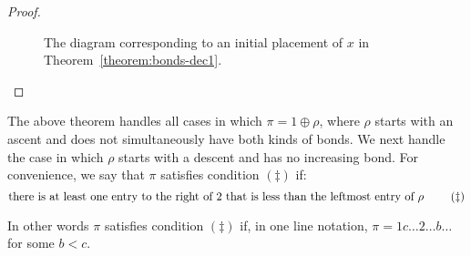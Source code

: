 \documentclass[10pt]{article}
\theoremstyle{plain}
\begin{document}
\begin{proof}
\begin{figure}
\begin{center}
		\end{center}
		\caption{The diagram corresponding to an initial placement of $x$ in Theorem~\ref{theorem:bonds-dec1}.}
		\label{figure:1plus-4}
	\endminipage
\end{figure}
\end{proof}


The above theorem handles all cases in which $\pi = 1 \oplus \rho$, where $\rho$ starts with an ascent and does not simultaneously have both kinds of bonds.  We next handle the case in which $\rho$ starts with a descent and has no increasing bond. For convenience, we say that $\pi$ satisfies condition $(\ddagger)$ if:
	\[\text{there is at least one entry to the right of 2 that is less than the leftmost entry of $\rho$ \tag{$\ddagger$}}\]

In other words $\pi$ satisfies condition $(\ddagger)$ if, in one line notation, $\pi = 1 c \dots 2 \dots b \dots$ for some $b < c$.
\end{document}

